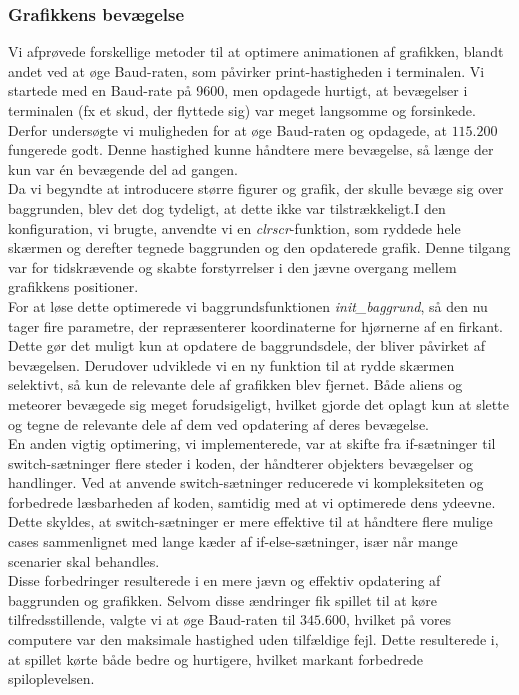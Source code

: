 \subsubsection{Grafikkens bevægelse}
Vi afprøvede forskellige metoder til at optimere animationen af grafikken, blandt andet ved at øge Baud-raten, som påvirker print-hastigheden i terminalen. Vi startede med en Baud-rate på 9600, men opdagede hurtigt, at bevægelser i terminalen (fx et skud, der flyttede sig) var meget langsomme og forsinkede. Derfor undersøgte vi muligheden for at øge Baud-raten og opdagede, at \(115.200\) fungerede godt. Denne hastighed kunne håndtere mere bevægelse, så længe der kun var én bevægende del ad gangen.\\
Da vi begyndte at introducere større figurer og grafik, der skulle bevæge sig over baggrunden, blev det dog tydeligt, at dette ikke var tilstrækkeligt.I den konfiguration, vi brugte, anvendte vi en \textit{clrscr}-funktion, som ryddede hele skærmen og derefter tegnede baggrunden og den opdaterede grafik. Denne tilgang var for tidskrævende og skabte forstyrrelser i den jævne overgang mellem grafikkens positioner.\\
For at løse dette optimerede vi baggrundsfunktionen \textit{init\_baggrund}, så den nu tager fire parametre, der repræsenterer koordinaterne for hjørnerne af en firkant. Dette gør det muligt kun at opdatere de baggrundsdele, der bliver påvirket af bevægelsen. Derudover udviklede vi en ny funktion til at rydde skærmen selektivt, så kun de relevante dele af grafikken blev fjernet. Både aliens og meteorer bevægede sig meget forudsigeligt, hvilket gjorde det oplagt kun at slette og tegne de relevante dele af dem ved opdatering af deres bevægelse.\\
En anden vigtig optimering, vi implementerede, var at skifte fra if-sætninger til switch-sætninger flere steder i koden, der håndterer objekters bevægelser og handlinger. Ved at anvende switch-sætninger reducerede vi kompleksiteten og forbedrede læsbarheden af koden, samtidig med at vi optimerede dens ydeevne. Dette skyldes, at switch-sætninger er mere effektive til at håndtere flere mulige cases sammenlignet med lange kæder af if-else-sætninger, især når mange scenarier skal behandles.\\
Disse forbedringer resulterede i en mere jævn og effektiv opdatering af baggrunden og grafikken. Selvom disse ændringer fik spillet til at køre tilfredsstillende, valgte vi at øge Baud-raten til \(345.600\), hvilket på vores computere var den maksimale hastighed uden tilfældige fejl. Dette resulterede i, at spillet kørte både bedre og hurtigere, hvilket markant forbedrede spiloplevelsen.

